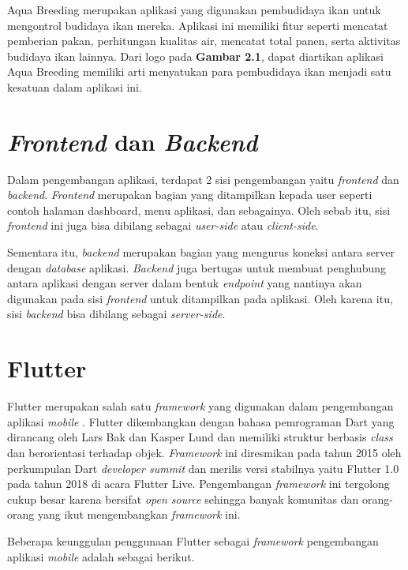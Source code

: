Aqua Breeding merupakan aplikasi yang digunakan pembudidaya ikan untuk mengontrol budidaya ikan mereka. Aplikasi ini memiliki fitur seperti mencatat pemberian pakan, perhitungan kualitas air, mencatat total panen, serta aktivitas budidaya ikan lainnya. Dari logo pada \textbf{Gambar 2.1}, dapat diartikan aplikasi Aqua Breeding memiliki arti menyatukan para pembudidaya ikan menjadi satu kesatuan dalam aplikasi ini.

\section{\textit{Frontend} dan \textit{Backend}}

Dalam pengembangan aplikasi, terdapat 2 sisi pengembangan yaitu \textit{frontend} dan \textit{backend}. \textit{Frontend} merupakan bagian yang ditampilkan kepada user seperti contoh halaman dashboard, menu aplikasi, dan sebagainya. Oleh sebab itu, sisi \textit{frontend} ini juga bisa dibilang sebagai \textit{user-side} atau \textit{client-side}.

Sementara itu, \textit{backend} merupakan bagian yang mengurus koneksi antara server dengan \textit{database} aplikasi. \textit{Backend} juga bertugas untuk membuat penghubung antara aplikasi dengan server dalam bentuk \textit{endpoint} yang nantinya akan digunakan pada sisi \textit{frontend} untuk ditampilkan pada aplikasi. Oleh karena itu, sisi \textit{backend} bisa dibilang sebagai \textit{server-side}.

\section{Flutter}

Flutter merupakan salah satu \textit{framework} yang digunakan dalam pengembangan aplikasi \textit{mobile} \citep{flutterweb}. Flutter dikembangkan dengan bahasa pemrograman Dart yang dirancang oleh Lars Bak dan Kasper Lund dan memiliki struktur berbasis \textit{class} dan berorientasi terhadap objek. \textit{Framework} ini diresmikan pada tahun 2015 oleh perkumpulan Dart \textit{developer summit}  dan merilis versi stabilnya yaitu Flutter 1.0 pada tahun 2018 di acara Flutter Live. Pengembangan \textit{framework} ini tergolong cukup besar karena bersifat \textit{open source} sehingga banyak komunitas dan orang-orang yang ikut mengembangkan \textit{framework} ini.

Beberapa keunggulan penggunaan Flutter sebagai \textit{framework} pengembangan aplikasi \textit{mobile} adalah sebagai berikut.


